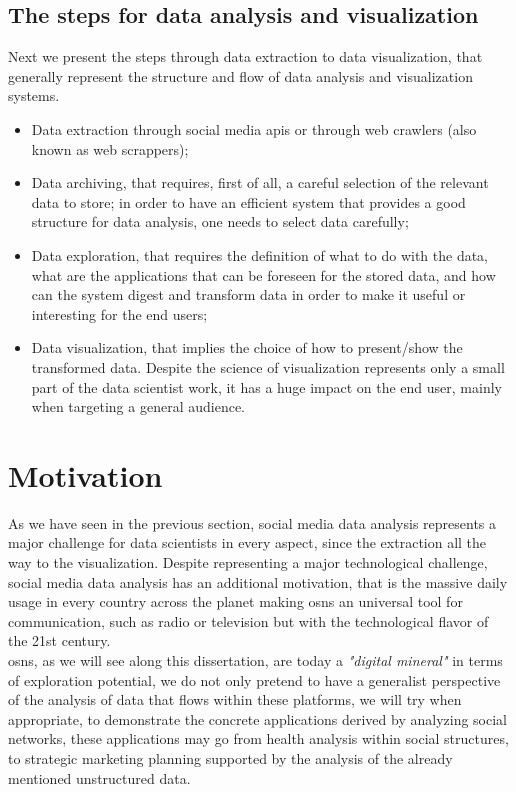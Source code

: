 \subsection*{The steps for data analysis and visualization}

Next we present the steps through data extraction to data visualization, that generally represent the structure and flow of data analysis and visualization systems.

\begin{itemize}
\item Data extraction through social media \glspl{api} or through web crawlers (also known as web scrappers);
\item Data archiving, that requires, first of all, a careful selection of the relevant data to store; in order to have an efficient system that provides a good structure for data analysis, one needs
to select data carefully;
\item Data exploration, that requires the definition of what to do with the data, what are the applications that can be foreseen for the stored data, and how can the system digest and transform data in order to make it useful or interesting for the end users;
\item Data visualization, that implies the choice of how to present/show the transformed data. Despite the science of visualization represents only a small part of the data scientist work, it has a huge impact on the end user, mainly when targeting a general audience.
\end{itemize}

\section{Motivation}
As we have seen in the previous section, social media data analysis represents a major challenge for data scientists in every aspect, since the extraction all the way to the visualization. Despite representing a major technological challenge, social media data analysis has an additional motivation, that is the massive daily usage in every country across the planet making \glspl{osn} an universal tool for communication, such as radio or television but with the technological flavor of the 21st century.\\
\indent \glspl{osn}, as we will see along this dissertation, are today a \textit{"digital mineral"} in terms of exploration potential, we do not only pretend to have a generalist perspective of the analysis of data that flows within these platforms, we will try when appropriate, to demonstrate the concrete applications derived by analyzing social networks, these applications may go from health analysis within social structures, to strategic marketing planning supported by the analysis of the already mentioned unstructured data.

